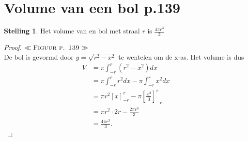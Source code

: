 \documentclass{article}
\theoremstyle{definition}
\newtheorem*{Stelling}{Stelling}
\begin{document}
\section{Volume van een bol p.139}
\begin{Stelling}
    Het volume van en bol met straal $r$ is $\frac{4\pi r^3}{3}$
\end{Stelling}
\begin{proof}
    $\ll\textsc{Figuur p. 139}\gg$\\ De bol is gevormd door $y=\sqrt{r^2-x^2}$ te wentelen om de x-as. Het volume is dus 
    \begin{align*}
        V &= \pi\int_{-r}^r (r^2-x^2) dx\\&= \pi\int_{-r}^r r^2 dx -\pi\int_{-r}^r x^2 dx\\&=\pi r^2\left[x\right]_{-r}^r - \pi\left[\frac{x^3}{3}\right]_{-r}^r\\&=\pi r^2\cdot 2r - \frac{2\pi r^3}{3}\\&=\frac{4\pi r^3}{3}.
    \end{align*}
\end{proof}\newpage
\end{document}
